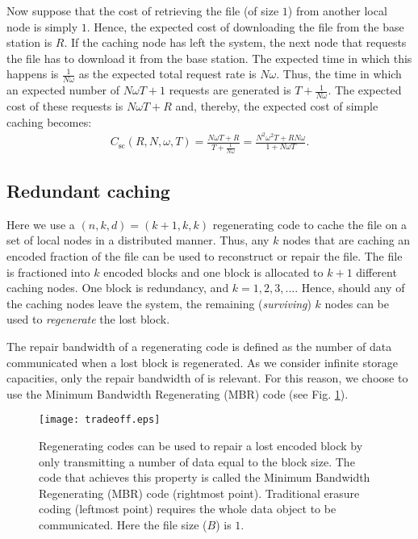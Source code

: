 \documentclass[10pt,conference]{IEEEtran}
\begin{document}
Now suppose that the cost of retrieving the file (of size $1$) from
another local node is simply $1$. Hence, the expected cost of
downloading the file from the base station is $R$. If the caching node
has left the system, the next node that requests the file has to
download it from the base station. The expected time in which this
happens is $\frac{1}{N\omega}$ as the expected total request rate is
$N\omega$. Thus, the time in which an expected number of $N\omega
T{+}1$ requests are generated is $T{+}\frac{1}{N\omega}$. The expected
cost of these requests is $N\omega T{+}R$ and, thereby, the expected
cost of simple caching becomes:
\begin{align}
C_{\text{sc}}(R,N,\omega,T) = \frac{N\omega T + R}{T + \frac{1}{N\omega}} = \frac{N^2\omega^2 T + RN\omega}{1 + N\omega T}.
\label{simp}
\end{align}

\subsection{Redundant caching}
Here we use a $(n,k,d)=(k{+}1,k,k)$ regenerating code \cite{dima} to
cache the file on a set of local nodes in a distributed manner. Thus,
any $k$ nodes that are caching an encoded fraction of the file can be
used to reconstruct or repair the file. The file is fractioned into
$k$ encoded blocks and one block is allocated to $k{+}1$ different
caching nodes. One block is redundancy, and $k=1,2,3,...$. Hence,
should any of the caching nodes leave the system, the remaining
(\emph{surviving}) $k$ nodes can be used to \emph{regenerate} the lost
block.

The repair bandwidth of a regenerating code is defined as the number of data communicated
when a lost block is regenerated. As we consider infinite storage capacities, only the repair bandwidth of is relevant. For this reason, we choose to use the
Minimum Bandwidth Regenerating (MBR) code (see Fig. \ref{tradeoff}).

\begin{figure}[tb]
\centering \texttt{[image: tradeoff.eps]}
\caption{Regenerating codes can be used to repair a lost encoded block by only transmitting a number of data equal to the block size. The code that achieves this property is called the Minimum Bandwidth Regenerating (MBR) code (rightmost point). Traditional erasure coding (leftmost point) requires the whole data object to be communicated. Here the file size ($B$) is $1$.}
\label{tradeoff}
\end{figure}
\end{document}
